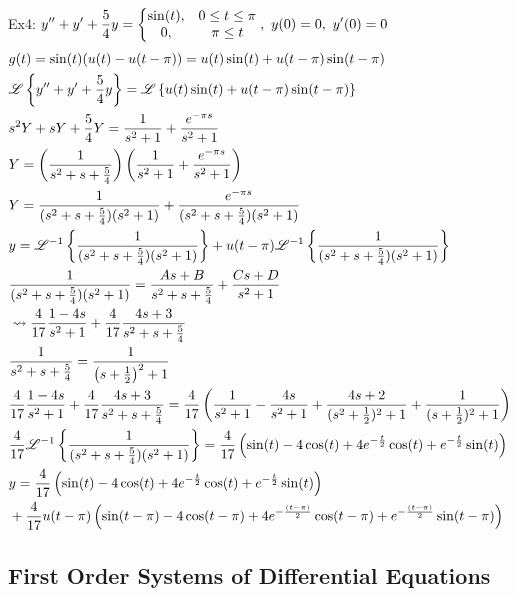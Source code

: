 \documentclass[11pt, fleqn]{article}
\begin{document}
Ex4: $\displaystyle{y''+y'+\frac{5}{4}y=\left\{\begin{matrix} \sin(t),&0\leq t\leq \pi\\0,&\pi\leq t \end{matrix}\right.,\ y(0)=0,\ y'(0)=0}$
\begin{align*}
    &g(t)=\sin(t)(u(t)-u(t-\pi))=u(t)\sin(t)+u(t-\pi)\sin(t-\pi)\\
    &\mathscr{L}\left\{ y''+y'+\frac{5}{4}y \right\}=\mathscr{L}\left\{ u(t)\sin(t)+u(t-\pi)\sin(t-\pi) \right\}\\
    &s^2Y+sY+\frac{5}{4}Y=\frac{1}{s^2+1}+\frac{e^{-\pi s}}{s^2+1}\\
    &Y=\left( \frac{1}{s^2+s+\frac{5}{4}} \right)\left( \frac{1}{s^2+1}+\frac{e^{-\pi s}}{s^2+1} \right)\\
    &Y=\frac{1}{(s^2+s+\frac{5}{4})(s^2+1)}+\frac{e^{-\pi s}}{(s^2+s+\frac{5}{4})(s^2+1)}\\
    &y=\mathscr{L}^{-1}\left\{ \frac{1}{(s^2+s+\frac{5}{4})(s^2+1)} \right\}+u(t-\pi)\mathscr{L}^{-1}\left\{ \frac{1}{(s^2+s+\frac{5}{4})(s^2+1)} \right\}\\
    &\frac{1}{(s^2+s+\frac{5}{4})(s^2+1)}=\frac{As+B}{s^2+s+\frac{5}{4}}+\frac{Cs+D}{s^2+1}\\
    &\leadsto\frac{4}{17}\frac{1-4s}{s^2+1}+\frac{4}{17}\frac{4s+3}{s^2+s+\frac{5}{4}}\\
    &\frac{1}{s^2+s+\frac{5}{4}}=\frac{1}{\left( s+\frac{1}{2} \right)^2+1}\\
    &\frac{4}{17}\frac{1-4s}{s^2+1}+\frac{4}{17}\frac{4s+3}{s^2+s+\frac{5}{4}}=\frac{4}{17}\left( \frac{1}{s^2+1}-\frac{4s}{s^2+1}+\frac{4s+2}{(s^2+\frac{1}{2})^2+1}+\frac{1}{(s+\frac{1}{2})^2+1} \right)\\
    &\frac{4}{17}\mathscr{L}^{-1}\left\{ \frac{1}{(s^2+s+\frac{5}{4})(s^2+1)} \right\}=\frac{4}{17}\left( \sin(t)-4\cos(t)+4e^{-\frac{t}{2}}\cos(t)+e^{-\frac{t}{2}}\sin(t) \right)\\
    &y=\frac{4}{17}\left( \sin(t)-4\cos(t)+4e^{-\frac{t}{2}}\cos(t)+e^{-\frac{t}{2}}\sin(t) \right)\\
    &+\frac{4}{17}u(t-\pi)\left( \sin(t-\pi)-4\cos(t-\pi)+4e^{-\frac{(t-\pi)}{2}}\cos(t-\pi)+e^{-\frac{(t-\pi)}{2}}\sin(t-\pi) \right)\\
\end{align*}















\subsection{First Order Systems of Differential Equations}
\end{document}

